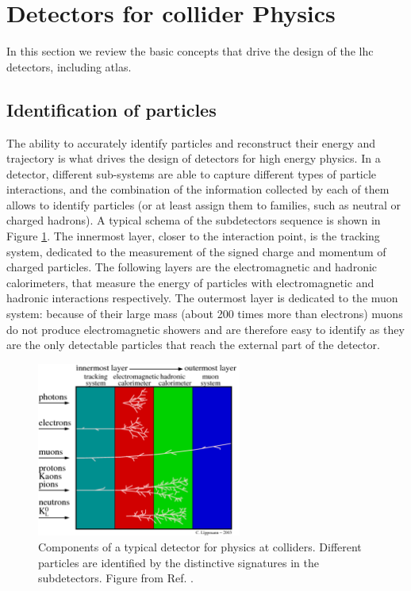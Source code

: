 \section{Detectors for collider Physics}
\label{sec:detectors}

In this section we review the basic concepts that drive the design of the \gls{lhc} detectors, including \gls{atlas}.

\subsection{Identification of particles}
\label{sec:detectors:identification}



The ability to accurately identify particles and reconstruct their energy and trajectory is what drives the design of detectors for high energy physics. In a detector, different sub-systems are able to capture different types of particle interactions, and the combination of the information collected by each of them allows to identify particles (or at least assign them to families, such as neutral or charged hadrons). A typical schema of the subdetectors sequence is shown in Figure \ref{fig:detector:interaction}. The innermost layer, closer to the interaction point, is the tracking system, dedicated to the measurement of the signed charge and momentum of charged particles. The following layers are the electromagnetic and hadronic calorimeters, that measure the energy of particles with electromagnetic and hadronic interactions respectively. The outermost layer is dedicated to the muon system: because of their large mass (about 200 times more than electrons) muons do not produce electromagnetic showers and are therefore easy to identify as they are the only detectable particles that reach the external part of the detector.

\begin{figure}[ht]
\centering
\includegraphics[width=0.6\textwidth]{figures/detector/particles_in_detector}
\caption{Components of a typical detector for physics at colliders. Different particles are identified by the distinctive signatures in the subdetectors. Figure from Ref. \cite{Lippmann:2011bb}.}
\label{fig:detector:interaction}
\end{figure}


